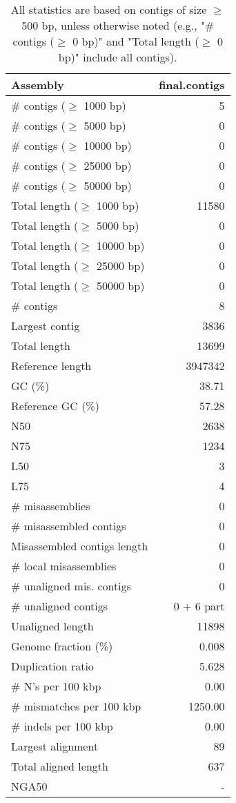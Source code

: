 \documentclass[12pt,a4paper]{article}
\begin{document}
\begin{table}[ht]
\begin{center}
\caption{All statistics are based on contigs of size $\geq$ 500 bp, unless otherwise noted (e.g., "\# contigs ($\geq$ 0 bp)" and "Total length ($\geq$ 0 bp)" include all contigs).}
\begin{tabular}{|l*{1}{|r}|}
\hline
Assembly & final.contigs \\ \hline
\# contigs ($\geq$ 1000 bp) & 5 \\ \hline
\# contigs ($\geq$ 5000 bp) & 0 \\ \hline
\# contigs ($\geq$ 10000 bp) & 0 \\ \hline
\# contigs ($\geq$ 25000 bp) & 0 \\ \hline
\# contigs ($\geq$ 50000 bp) & 0 \\ \hline
Total length ($\geq$ 1000 bp) & 11580 \\ \hline
Total length ($\geq$ 5000 bp) & 0 \\ \hline
Total length ($\geq$ 10000 bp) & 0 \\ \hline
Total length ($\geq$ 25000 bp) & 0 \\ \hline
Total length ($\geq$ 50000 bp) & 0 \\ \hline
\# contigs & 8 \\ \hline
Largest contig & 3836 \\ \hline
Total length & 13699 \\ \hline
Reference length & 3947342 \\ \hline
GC (\%) & 38.71 \\ \hline
Reference GC (\%) & 57.28 \\ \hline
N50 & 2638 \\ \hline
N75 & 1234 \\ \hline
L50 & 3 \\ \hline
L75 & 4 \\ \hline
\# misassemblies & 0 \\ \hline
\# misassembled contigs & 0 \\ \hline
Misassembled contigs length & 0 \\ \hline
\# local misassemblies & 0 \\ \hline
\# unaligned mis. contigs & 0 \\ \hline
\# unaligned contigs & 0 + 6 part \\ \hline
Unaligned length & 11898 \\ \hline
Genome fraction (\%) & 0.008 \\ \hline
Duplication ratio & 5.628 \\ \hline
\# N's per 100 kbp & 0.00 \\ \hline
\# mismatches per 100 kbp & 1250.00 \\ \hline
\# indels per 100 kbp & 0.00 \\ \hline
Largest alignment & 89 \\ \hline
Total aligned length & 637 \\ \hline
NGA50 & - \\ \hline
\end{tabular}
\end{center}
\end{table}
\end{document}
